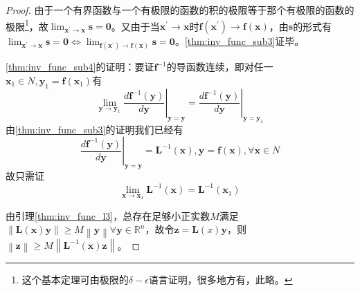 \documentclass[main.tex]{subfiles}
\begin{document}
\begin{proof}
由于一个有界函数与一个有极限的函数的积的极限等于那个有极限的函数的极限\footnote{这个基本定理可由极限的$\delta-\epsilon$语言证明，很多地方有，此略。}，故$\lim_{\mathbf{x}^\prime\to\mathbf{x}}\mathbf{s}=\mathbf{0}$。又由于当$\mathbf{x}^\prime\to\mathbf{x}$时$\mathbf{f}\left(\mathbf{x}^\prime\right)\to\mathbf{f}\left(\mathbf{x}\right)$，由$\mathbf{s}$的形式有$\lim_{\mathbf{x}^\prime\to\mathbf{x}}\mathbf{s}=\mathbf{0}\Leftrightarrow\lim_{\mathbf{f}\left(\mathbf{x}^\prime\right)\to\mathbf{f}\left(\mathbf{x}\right)}\mathbf{s}=\mathbf{0}$。\ref{thm:inv_func_sub3}证毕。

\ref{thm:inv_func_sub4}的证明：要证$\mathbf{f}^{-1}$的导函数连续，即对任一$\mathbf{x}_1\in N, \mathbf{y}_1=\mathbf{f}\left(\mathbf{x}_1\right)$有
\[\lim_{\mathbf{y}\to\mathbf{y}_1}\left.\frac{d\mathbf{f}^{-1}\left(\mathbf{y}\right)}{d\mathbf{y}}\right|_{\mathbf{y}=\mathbf{y}}=\left.\frac{d\mathbf{f}^{-1}\left(\mathbf{y}\right)}{d\mathbf{y}}\right|_{\mathbf{y}=\mathbf{y}_1}\]
由\ref{thm:inv_func_sub3}的证明我们已经有
\[
\left.\frac{d\mathbf{f}^{-1}\left(\mathbf{y}\right)}{d\mathbf{y}}\right|_{\mathbf{y}=\mathbf{y}}=\mathbf{L}^{-1}\left(\mathbf{x}\right),\mathbf{y}=\mathbf{f}\left(\mathbf{x}\right),\forall\mathbf{x}\in N\]
故只需证
\[\lim_{\mathbf{x}\to\mathbf{x}_1}\mathbf{L}^{-1}\left(\mathbf{x}\right)=\mathbf{L}^{-1}\left(\mathbf{x}_1\right)\]

由引理\ref{thm:inv_func_l3}，总存在足够小正实数$M$满足$\left\|\mathbf{L}\left(\mathbf{x}\right)\mathbf{y}\right\|\geq M\left\|\mathbf{y}\right\|\forall\mathbf{y}\in\mathbb{R}^n$，故令$\mathbf{z}=\mathbf{L}\left(x\right)\mathbf{y}$，则$\left\|\mathbf{z}\right\|\geq M\left\|\mathbf{L}^{-1}\left(\mathbf{x}\right)\mathbf{z}\right\|$。


\end{proof}
\end{document}
